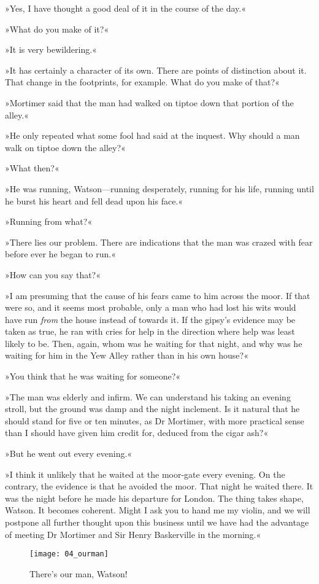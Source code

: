 »Yes, I have thought a good deal of it in the course of the day.«

»What do you make of it?«

»It is very bewildering.«

»It has certainly a character of its own. There are points of distinction about it. That change in the footprints, for example. What do you make of that?«

»Mortimer said that the man had walked on tiptoe down that portion of the alley.«

»He only repeated what some fool had said at the inquest. Why should a man walk on tiptoe down the alley?«

»What then?«

»He was running, Watson\allowbreak---\allowbreak running desperately, running for his life, running until he burst his heart and fell dead upon his face.«

»Running from what?«

»There lies our problem. There are indications that the man was crazed with fear before ever he began to run.«

»How can you say that?«

»I am presuming that the cause of his fears came to him across the moor. If that were so, and it seems most probable, only a man who had lost his wits would have run \emph{from} the house instead of towards it. If the gipsy's evidence may be taken as true, he ran with cries for help in the direction where help was least likely to be. Then, again, whom was he waiting for that night, and why was he waiting for him in the Yew Alley rather than in his own house?«

»You think that he was waiting for someone?«

»The man was elderly and infirm. We can understand his taking an evening stroll, but the ground was damp and the night inclement. Is it natural that he should stand for five or ten minutes, as Dr Mortimer, with more practical sense than I should have given him credit for, deduced from the cigar ash?«

»But he went out every evening.«

»I think it unlikely that he waited at the moor-gate every evening. On the contrary, the evidence is that he avoided the moor. That night he waited there. It was the night before he made his departure for London. The thing takes shape, Watson. It becomes coherent. Might I ask you to hand me my violin, and we will postpone all further thought upon this business until we have had the advantage of meeting Dr Mortimer and Sir Henry Baskerville in the morning.«
\clearpage
\vfill
\begin{figure}[ph!]
\centering
\texttt{[image: 04\_ourman]}
\caption{There's our man, Watson!}
\end{figure}
\vfill
\thispagestyle{empty}
\clearpage

